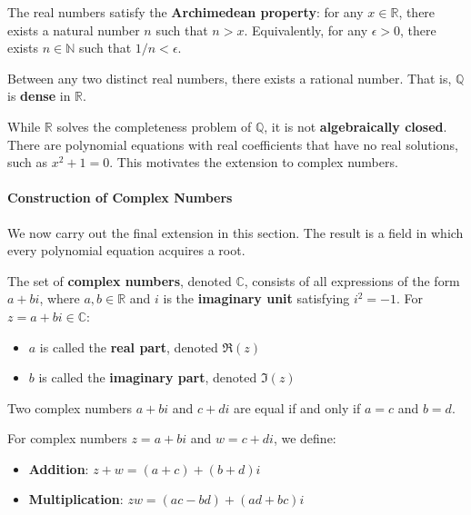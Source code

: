 \begin{definition}
The real numbers satisfy the \textbf{Archimedean property}: for any $x \in \mathbb{R}$, there exists a natural number $n$ such that $n > x$. Equivalently, for any $\epsilon > 0$, there exists $n \in \mathbb{N}$ such that $1/n < \epsilon$.
\end{definition}

\begin{theorem}
Between any two distinct real numbers, there exists a rational number. That is, $\mathbb{Q}$ is \textbf{dense} in $\mathbb{R}$.
\end{theorem}

While $\mathbb{R}$ solves the completeness problem of $\mathbb{Q}$, it is not \textbf{algebraically closed}. There are polynomial equations with real coefficients that have no real solutions, such as $x^2 + 1 = 0$. This motivates the extension to complex numbers.



\paragraph{Construction of Complex Numbers}

We now carry out the final extension in this section. The result is a field in which every polynomial equation acquires a root.

\begin{definition}
The set of \textbf{complex numbers}, denoted $\mathbb{C}$, consists of all expressions of the form $a + bi$, where $a, b \in \mathbb{R}$ and $i$ is the \textbf{imaginary unit} satisfying $i^2 = -1$. For $z = a + bi \in \mathbb{C}$:
\begin{itemize}
    \item $a$ is called the \textbf{real part}, denoted $\Re(z)$
    \item $b$ is called the \textbf{imaginary part}, denoted $\Im(z)$
\end{itemize}
\end{definition}

Two complex numbers $a + bi$ and $c + di$ are equal if and only if $a = c$ and $b = d$.

\begin{definition}
For complex numbers $z = a + bi$ and $w = c + di$, we define:
\begin{itemize}
    \item \textbf{Addition}: $z + w = (a + c) + (b + d)i$
    \item \textbf{Multiplication}: $zw = (ac - bd) + (ad + bc)i$
\end{itemize}
\end{definition}

